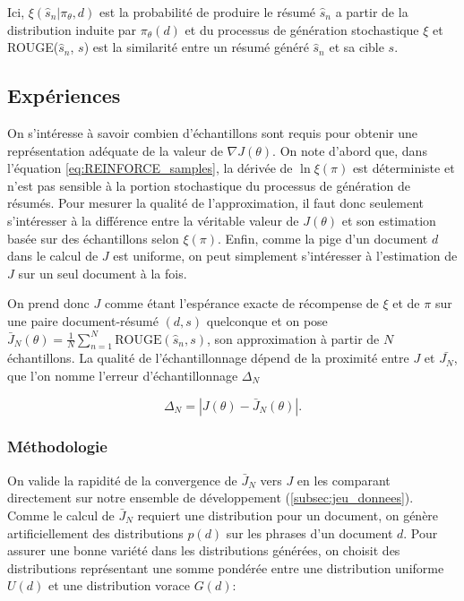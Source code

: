Ici, $\xi\left(\hat{s}_n| \pi_\theta, d\right)$ est la probabilité de produire le résumé $\hat{s}_n$
a partir de la distribution induite par $\pi_\theta(d)$ et du processus de génération stochastique
$\xi$ et ROUGE($\hat{s}_n$, $s$) est la similarité entre un résumé généré $\hat{s}_n$ et sa cible $s$.

\subsection{Expériences}

On s'intéresse à savoir combien d'échantillons sont requis pour obtenir une représentation 
adéquate de la valeur de $\nabla J(\theta)$.
On note d'abord que, dans l'équation \eqref{eq:REINFORCE_samples}, la dérivée de $\ln \xi(\pi)$ est déterministe
et n'est pas sensible à la portion stochastique du processus de génération de résumés.
Pour mesurer la qualité de l'approximation, il faut donc seulement s'intéresser
à la différence entre la véritable valeur de $J(\theta)$ et son estimation 
basée sur des échantillons selon $\xi(\pi)$.
Enfin, comme la pige d'un document $d$ dans le calcul de $J$ est uniforme, on
peut simplement s'intéresser à l'estimation de $J$ sur un seul document à la fois.

On prend donc $J$ comme étant l'espérance exacte de récompense de $\xi$ et de $\pi$ sur une paire 
document-résumé $(d, s)$ quelconque et on pose
$\bar{J}_N(\theta) =  \frac{1}{N} \sum_{n=1}^N \text{ROUGE}(\hat{s}_n, s)$, son approximation 
à partir de $N$ échantillons.
La qualité de l'échantillonnage dépend de la proximité entre $J$ et $\bar{J_N}$, que
l'on nomme l'erreur d'échantillonnage $\Delta_N$

\begin{equation}
    \Delta_N = \left| J(\theta) - \bar{J}_N(\theta) \right|.
    \label{eq:erreur_echantillonnage}
\end{equation}

\subsubsection*{Méthodologie}

On valide la rapidité de la convergence de $\bar{J}_N$ vers $J$ en les comparant
directement sur notre ensemble de développement (\ref{subsec:jeu_donnees}).
Comme le calcul de $\bar{J}_N$ requiert une distribution pour un document,
on génère artificiellement des distributions $p(d)$ sur les phrases d'un document $d$.
Pour assurer une bonne variété dans les distributions générées, on choisit des
distributions représentant une somme pondérée entre une distribution uniforme
$U(d)$ et une distribution vorace $G(d)$:

